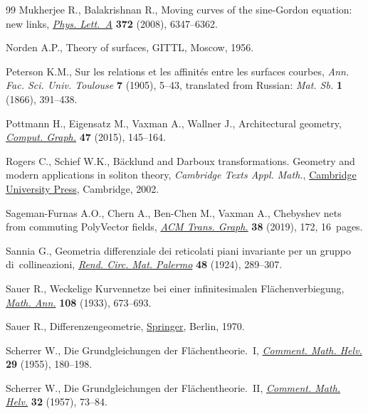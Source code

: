 \documentclass[pdftex]{sigma}
\numberwithin{equation}{section}
\begin{document}
\begin{thebibliography}{99}
Mukherjee R., Balakrishnan R., Moving curves of the sine-{G}ordon equation: new
  links, \href{https://doi.org/10.1016/j.physleta.2008.08.070}{\textit{Phys. Lett.~A}} \textbf{372} (2008), 6347--6362.

Norden A.P., Theory of surfaces, GITTL, Moscow, 1956.

Peterson K.M., Sur les relations et les affinit\'es entre les surfaces courbes,
  \textit{Ann. Fac. Sci. Univ. Toulouse} \textbf{7} (1905), 5--43, translated from Russian: \textit{Mat. Sb.}
  \textbf{1} (1866), 391--438.

Pottmann H., Eigensatz M., Vaxman A., Wallner J., Architectural geometry,
  \href{https://doi.org/10.1016/j.cag.2014.11.002}{\textit{Comput. Graph.}} \textbf{47} (2015), 145--164.

Rogers C., Schief W.K., B\"acklund and {D}arboux transformations. Geometry and
  modern applications in soliton theory, \textit{Cambridge Texts Appl. Math.}, \href{https://doi.org/10.1017/CBO9780511606359}{Cambridge
  University Press}, Cambridge, 2002.

Sageman-Furnas A.O., Chern A., Ben-Chen M., Vaxman A., {C}hebyshev nets from
  commuting {PolyVector} fields, \href{https://doi.org/10.1145/3355089.3356564}{\textit{ACM Trans. Graph.}} \textbf{38} (2019),
  172, 16~pages.

Sannia G., Geometria differenziale dei reticolati piani invariante per un
  gruppo di~collineazioni, \href{https://doi.org/10.1007/BF03014704}{\textit{Rend. Circ. Mat. Palermo}} \textbf{48}
  (1924), 289--307.

Sauer R., Weckelige {K}urvennetze bei einer infinitesimalen
  {F}l\"achenverbiegung, \href{https://doi.org/10.1007/BF01452858}{\textit{Math. Ann.}} \textbf{108} (1933), 673--693.

Sauer R., Differenzengeometrie, \href{https://doi.org/10.1007/978-3-642-86411-7}{Springer}, Berlin, 1970.

Scherrer W., Die {G}rundgleichungen der {F}l\"achentheorie.~{I},
  \href{https://doi.org/10.1007/BF02564278}{\textit{Comment. Math. Helv.}} \textbf{29} (1955), 180--198.

Scherrer W., Die {G}rundgleichungen der {F}l\"achentheorie.~{II},
  \href{https://doi.org/10.1007/BF02564571}{\textit{Comment. Math. Helv.}} \textbf{32} (1957), 73--84.


\end{thebibliography}
\end{document}
